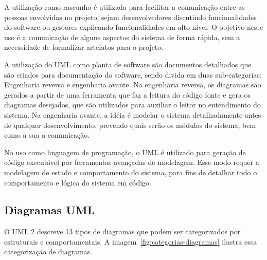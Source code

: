 A utilização como rascunho é utilizada para facilitar a comunicação entre as pessoas envolvidas no projeto, sejam desenvolvedores discutindo funcionalidades do software ou gestores explicando funcionalidades em alto nível. O objetivo neste uso é a comunicação de alguns aspectos do sistema de forma rápida, sem a necessidade de formalizar artefatos para o projeto.

A utilização do UML como planta de software são documentos detalhados que são criados para documentação do software, sendo divida em duas sub-categorias: Engenharia reversa e engenharia avante. Na engenharia reversa, os diagramas são gerados a partir de uma ferramenta que faz a leitura do código fonte e gera os diagramas desejados, que são utilizados para auxiliar o leitor no entendimento do sistema. Na engenharia avante, a idéia é modelar o sistema detalhadamente antes de qualquer desenvolvimento, prevendo quais serão os módulos do sistema, bem como a sua a comunicação.

No uso como linguagem de programação, o UML é utilizado para geração de código executável por ferramentas avançadas de modelagem. Esse modo requer a modelagem de estado e comportamento do sistema, para fins de detalhar todo o comportamento e lógica do sistema em código.

\subsection{Diagramas UML}

O UML 2 descreve 13 tipos de diagramas que podem ser categorizados por estruturais e comportamentais. A imagem~\ref{fig:categorias-diagramas} ilustra essa categorização de diagramas.

